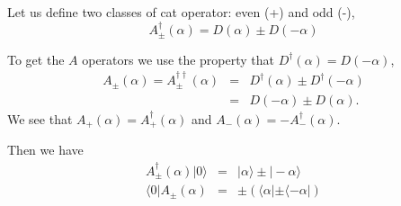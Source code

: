 \documentclass[aps,prl,twocolumn,amsmath,amssymb,nofootinbib,superscriptaddress]{revtex4}
\newcommand{\bra}[1]{\langle#1|}
\newcommand{\ket}[1]{|#1\rangle}
\begin{document}
Let us define two classes of cat operator: even (+) and odd (-),
\begin{equation}
A^\dag_\pm(\alpha) = D(\alpha) \pm D(-\alpha)
\end{equation}

To get the $A$ operators we use the property that $D^{\dag}(\alpha)=D(-\alpha)$,
\begin{eqnarray}
A_{\pm}(\alpha)=A_{\pm}^{\dag\dag}(\alpha)&=&D^{\dag}(\alpha)\pm D^{\dag}(-\alpha) \nonumber \\
&=&D(-\alpha)\pm D(\alpha).
\end{eqnarray}
We see that $A_+(\alpha)=A^{\dag}_+(\alpha)$ and $A_-(\alpha)=-A^{\dag}_-(\alpha)$.

Then we have
\begin{eqnarray}
A^\dag_\pm(\alpha) \ket{0} &=& \ket{\alpha} \pm \ket{-\alpha} \\
\bra{0}A_\pm(\alpha) &=& \pm \left(\bra{\alpha} \pm \bra{-\alpha}\right)
\end{eqnarray}
\end{document}
